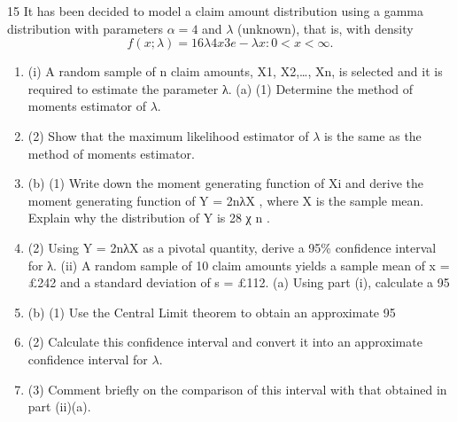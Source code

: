 \documentclass[a4paper,12pt]{article}
\begin{document}

15 It has been decided to model a claim amount distribution using a gamma
distribution with parameters $\alpha = 4$ and $\lambda$ (unknown), that is, with density
\[f(x; \lambda ) =
1
6
λ4 x3 e−λx: 0 < x < ∞.\]
\begin{enumerate}
    \item (i) A random sample of n claim amounts, X1, X2,\ldots , Xn, is selected and it is
required to estimate the parameter λ.
(a) (1) Determine the method of moments estimator of $\lambda$.
\item (2) Show that the maximum likelihood estimator of $\lambda$ is the same as the method of moments estimator.
\item (b) (1) Write down the moment generating function of Xi and
derive the moment generating function of Y = 2nλX , where X is the sample mean. Explain why the distribution of Y
is 28
χ n .
\item (2) Using Y = 2nλX as a pivotal quantity, derive a 95\% confidence interval for λ. 
(ii) A random sample of 10 claim amounts yields a sample mean of x = £242
and a standard deviation of s = £112.
(a) Using part (i), calculate a 95%
\item (b) (1) Use the Central Limit theorem to obtain an approximate
95%
\item (2) Calculate this confidence interval and convert it into an
approximate confidence interval for $\lambda$.
\item (3) Comment briefly on the comparison of this interval with
that obtained in part (ii)(a). 
\end{enumerate}
\end{document}
